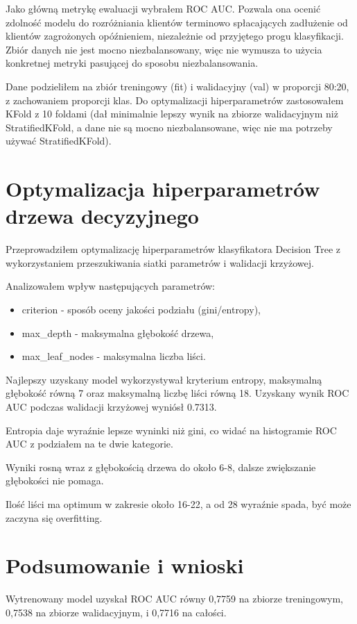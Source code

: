 \documentclass[a4paper,10pt]{article}
\begin{document}
Jako główną metrykę ewaluacji wybrałem ROC AUC. Pozwala ona ocenić zdolność modelu do rozróżniania klientów terminowo spłacających zadłużenie od klientów zagrożonych opóźnieniem, niezależnie od przyjętego progu klasyfikacji.
Zbiór danych nie jest mocno niezbalansowany, więc nie wymusza to użycia konkretnej metryki pasującej do sposobu niezbalansowania.

Dane podzieliłem na zbiór treningowy (fit) i walidacyjny (val) w proporcji 80:20, z zachowaniem proporcji klas. Do optymalizacji hiperparametrów zastosowałem KFold z 10 foldami (dał minimalnie lepszy wynik na zbiorze walidacyjnym niż StratifiedKFold, a dane nie są mocno niezbalansowane, więc nie ma potrzeby używać StratifiedKFold).

\section{Optymalizacja hiperparametrów drzewa decyzyjnego}

Przeprowadziłem optymalizację hiperparametrów klasyfikatora Decision Tree z wykorzystaniem przeszukiwania siatki parametrów i walidacji krzyżowej.

Analizowałem wpływ następujących parametrów:
\begin{itemize}
    \item criterion - sposób oceny jakości podziału (gini/entropy),
    \item max\_depth - maksymalna głębokość drzewa,
    \item max\_leaf\_nodes - maksymalna liczba liści.
\end{itemize}
Najlepszy uzyskany model wykorzystywał kryterium entropy, maksymalną głębokość równą 7 oraz maksymalną liczbę liści równą 18. Uzyskany wynik ROC AUC podczas walidacji krzyżowej wyniósł 0.7313.

Entropia daje wyraźnie lepsze wyninki niż gini, co widać na histogramie ROC AUC z podziałem na te dwie kategorie.

Wyniki rosną wraz z głębokością drzewa do około 6-8, dalsze zwiększanie głębokości nie pomaga.

Ilość liści ma optimum w zakresie około 16-22, a od 28 wyraźnie spada, być może zaczyna się overfitting.

\section{Podsumowanie i wnioski}

Wytrenowany model uzyskał ROC AUC równy 0,7759 na zbiorze treningowym, 0,7538 na zbiorze walidacyjnym, i 0,7716 na całości.
\end{document}
